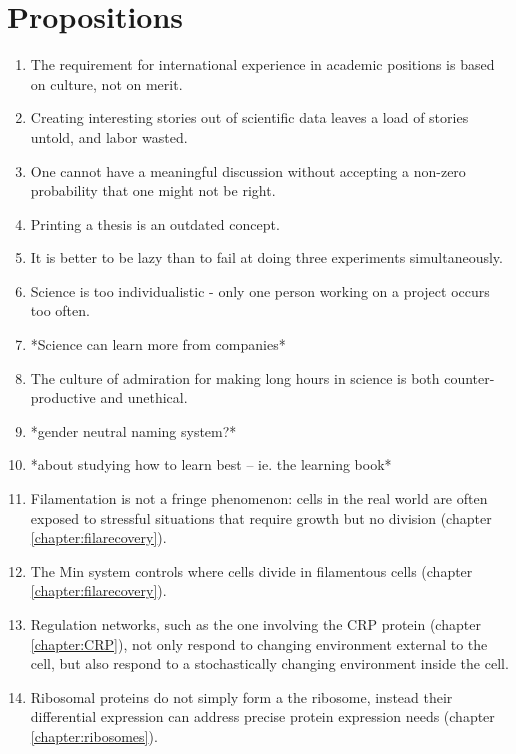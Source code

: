 



\chapter*{Propositions}

\begin{enumerate}
    \item The requirement for international experience in academic positions is based on culture, not on merit.
    \item Creating interesting stories out of scientific data leaves a load of stories untold, and labor wasted.    
    \item One cannot have a meaningful discussion without accepting a non-zero probability that one might not be right.
    \item Printing a thesis is an outdated concept.
    \item It is better to be lazy than to fail at doing three experiments simultaneously.
    \item Science is too individualistic - only one person working on a project occurs too often.
    \item *Science can learn more from companies*
    \item The culture of admiration for making long hours in science is both counter-productive and unethical.
    \item *gender neutral naming system?*
    \item *about studying how to learn best -- ie. the learning book*
    \item Filamentation is not a fringe phenomenon: cells in the real world are often exposed to stressful situations that require growth but no division (chapter \ref{chapter:filarecovery}).
    \item The Min system controls where cells divide in filamentous cells (chapter \ref{chapter:filarecovery}).
    \item Regulation networks, such as the one involving the CRP protein (chapter \ref{chapter:CRP}), not only respond to changing environment external to the cell, but also respond to a stochastically changing environment inside the cell.
    \item Ribosomal proteins do not simply form a the ribosome, instead their differential expression can address precise protein expression needs (chapter \ref{chapter:ribosomes}).
\end{enumerate}


